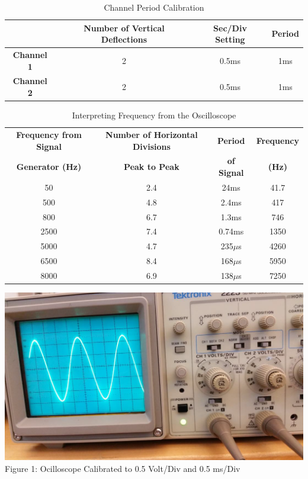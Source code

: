 \documentclass{article}
\begin{document}
\begin{table}[h!]
	\caption{Channel Period Calibration}
	\begin{center}
	\begin{tabular}{c|c|c|c}
			   & \textbf{Number of Vertical Deflections} & \textbf{Sec/Div Setting} & \textbf{Period} \\
			   \hline
		\textbf{Channel 1}  & 2                              & 0.5ms              & 1ms    \\
		\textbf{Channel 2}  & 2                              & 0.5ms              & 1ms    \\
	\end{tabular}
\end{center}
\vspace{2cm}
\end{table}
\begin{table}[ht!]
\begin{center}
	\caption{Interpreting Frequency from the Oscilloscope}
	\vspace{0.2cm}
	\begin{tabular}{c|c|c|c}
		\textbf{Frequency from Signal} & \textbf{Number of Horizontal Divisions} & \textbf{Period} & \textbf{Frequency}\\
		\textbf{Generator (Hz)} & \textbf{Peak to Peak} & \textbf{of Signal} & \textbf{(Hz)}\\
		\hline
		50 & 2.4 & 24ms & 41.7\\
		500& 4.8 & 2.4ms & 417\\
		800& 6.7 & 1.3ms & 746\\
		2500&7.4 & 0.74ms& 1350\\
		5000&4.7 & 235$\mu$s&4260\\
		6500&8.4&168$\mu$s&5950\\
		8000&6.9&138$\mu$s&7250\\

	\end{tabular}
\end{center}
\end{table}
\vspace{0.8cm}
	    \begin{minipage}[t]{0.5\textwidth}
		  \includegraphics[width=0.99\linewidth, frame]{example1}\\
			 Figure 1: Ocilloscope Calibrated to 0.5 Volt/Div and 0.5 ms/Div
	     \end{minipage}
\end{document}
